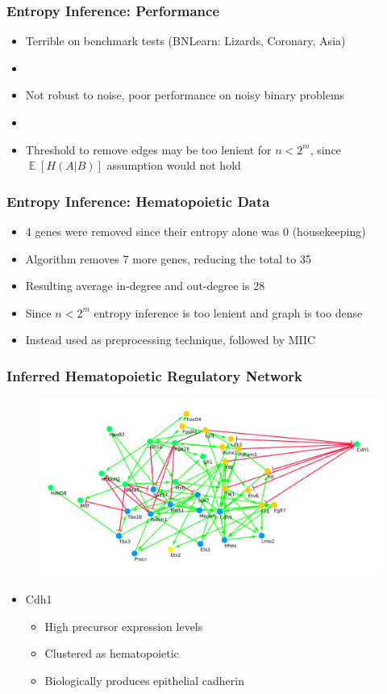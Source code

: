 \documentclass[14pt,aspectratio=169]{beamer}
\DeclareMathOperator{\EX}{\mathbb{E}}
\begin{document}
\begin{frame}
\frametitle{Entropy Inference: Performance}
\begin{itemize}
\item Terrible on benchmark tests (BNLearn: Lizards, Coronary, Asia)
\item[]
\item Not robust to noise, poor performance on noisy binary problems
\item[]
\item Threshold to remove edges may be too lenient for $n < 2^m$, since $\EX[H(A|B)]$ assumption would not hold
\end{itemize}
\end{frame}

\begin{frame}
\frametitle{Entropy Inference: Hematopoietic Data}
\begin{itemize}
\item 4 genes were removed since their entropy alone was 0 (housekeeping) 
\item Algorithm removes 7 more genes, reducing the total to 35
\item Resulting average in-degree and out-degree is 28
\item Since $n < 2^m$ entropy inference is too lenient and graph is too dense
\item Instead used as preprocessing technique, followed by MIIC
\end{itemize}
\end{frame}


\begin{frame}
\frametitle{Inferred Hematopoietic Regulatory Network}


\begin{figure}
	\includegraphics*[height = 0.55\textheight]{../Datasets/miic-trimmed/miic-trimmed.png}
\end{figure}
\begin{itemize}
\item Cdh1
	\begin{itemize}
	\item High precursor expression levels
	\item Clustered as hematopoietic
	\item Biologically produces epithelial cadherin
	\end{itemize}
\end{itemize}
\end{frame}
\end{document}

